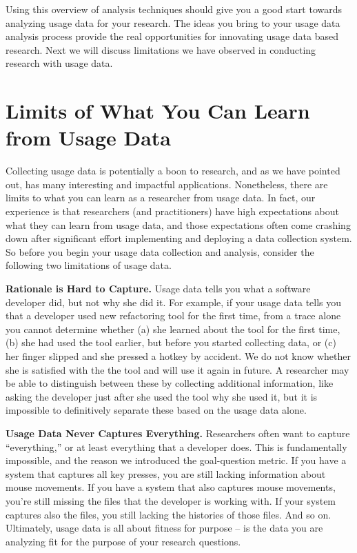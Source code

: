 \vspace{0.1in}
Using this overview of analysis techniques should give you a good start towards analyzing usage data for your research.
The ideas you bring to your usage data analysis process provide the real opportunities for innovating usage data based research.  Next we will discuss limitations we have observed in conducting research with usage data.

\section{Limits of What You Can Learn from Usage Data}
\label{sec:limitations}

Collecting usage data is potentially a boon to research, and as we have
pointed out, has many interesting and impactful applications.
Nonetheless, there are limits to what you can learn as a researcher
from usage data.
In fact, our experience is that researchers (and practitioners) have
high expectations about what they can learn from usage data, and those
expectations often come crashing down after significant effort implementing
and deploying a data collection system.
So before you begin your usage data collection and analysis, consider
the following two limitations of usage data.

\textbf{Rationale is Hard to Capture.}
Usage data tells you what a software developer did, but not
why she did it.
For example, if your usage data tells you that a developer used
new refactoring tool for the first time, from a trace alone you cannot determine whether
(a) she learned about the tool for the first time, (b) she had used the tool earlier, but before you started collecting data, or (c) her finger slipped and she pressed a hotkey by accident. We do not know whether she is satisfied with the the tool and will use it again in future.
A researcher may be able to distinguish between these by collecting additional information,
like asking the developer just after she used the tool why she used it,
but it is impossible to definitively separate these based on the
usage data alone.

\textbf{Usage Data Never Captures Everything.}
Researchers often want to capture ``everything,'' or at least
everything that a developer does.
This is fundamentally impossible, and the reason we introduced the
goal-question metric.
If you have a system that captures all key presses, you are still
lacking information about mouse movements.
If you have a system that also captures mouse movements, you're still
missing the files that the developer is working with.
If your system captures also the files, you still lacking the
histories of those files.
And so on.
Ultimately, usage data is all about fitness for purpose -- is the data
you are analyzing fit for the purpose of your research questions.

